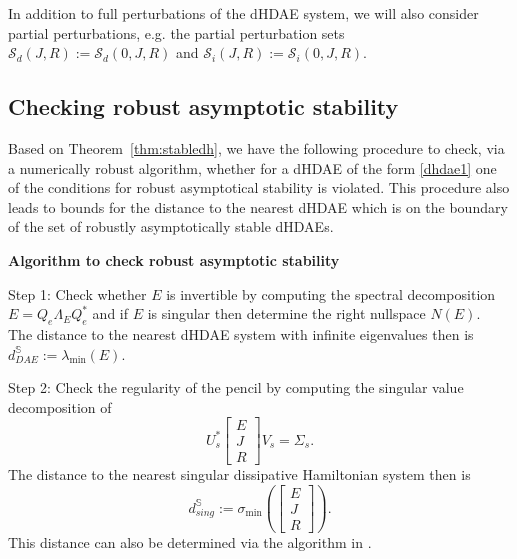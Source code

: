 \documentclass[11pt]{article}
\newcommand {\mat}[1]{\left[\begin{array}{#1}}
\newcommand {\rix}{\end{array}\right]}
\begin{document}
In addition to full perturbations of the dHDAE system, we will also consider partial perturbations, e.g.
the partial perturbation sets $\mathcal S_d(J,R):=\mathcal S_d(0,J,R)$ and $\mathcal S_i(J,R):= \mathcal S_i(0,J,R)$.
%
%



\subsection{Checking robust asymptotic stability}\label{sec:distalg}

Based on  Theorem~\ref{thm:stabledh},
we have the following procedure to check, via a numerically robust algorithm, whether for a dHDAE of the form \eqref{dhdae1} one of the conditions  for robust asymptotical stability is violated. This procedure also leads  to bounds for the distance to the nearest dHDAE which is on the boundary of the set of robustly asymptotically stable dHDAEs.

{\bf \label{alg:dist} Algorithm to check robust asymptotic stability}

Step 1: Check whether $E$ is invertible by computing the %
spectral decomposition $E=Q_e \Lambda_E Q_e^*$ and if $E$ is singular then determine the right nullspace $N(E)$.\\
The distance to the nearest dHDAE system with infinite eigenvalues then is   $d_{DAE}^{\mathbb S}:=\lambda_{\min}(E)$.

Step 2: Check the regularity of the pencil by computing the singular value decomposition of %
\[
U_s^*\mat{c} E\\ J\\ R\rix V_s=\Sigma_s.
\]
The distance to the nearest singular dissipative Hamiltonian system then is
\[
d_{sing}^{\mathbb S}:=\sigma_{\min}\left (\mat{c} E\\ J\\ R\rix \right ).
\]
This distance can also be determined via the algorithm in \cite{GugM22}.
\end{document}
